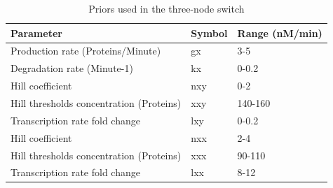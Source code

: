 \begin{table}[htpb]
\centering
\caption{Priors used in the three-node switch}
\label{tab:multi_priors}
\begin{tabular}{@{}lll@{}}
\toprule
Parameter                           & Symbol & Range (nM/min)  \\ \midrule
Production rate (Proteins/Minute)               & gx        & 3-5    \\
Degradation rate  (Minute-1)             & kx        & 0-0.2     \\
Hill coefficient               & nxy       & 0-2    \\
Hill thresholds concentration (Proteins) & xxy       & 140-160 \\
Transcription rate fold change & lxy       & 0-0.2     \\
Hill coefficient               & nxx       & 2-4     \\
Hill thresholds concentration (Proteins) & xxx       & 90-110  \\
Transcription rate fold change & lxx       & 8-12    \\ \bottomrule
\end{tabular}
\end{table}

